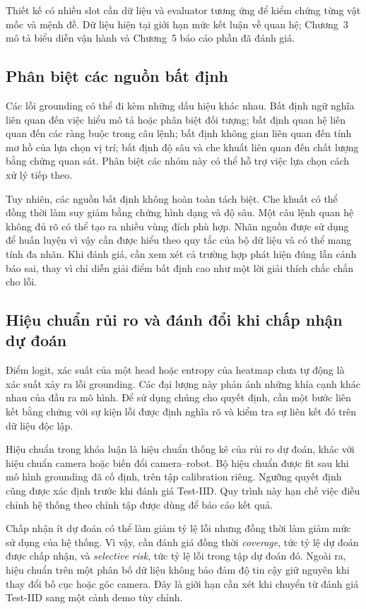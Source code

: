 Thiết kế có nhiều slot cần dữ liệu và evaluator tương ứng để kiểm chứng từng vật mốc và mệnh đề. Dữ liệu hiện tại giới hạn mức kết luận về quan hệ; Chương~3 mô tả biểu diễn vận hành và Chương~5 báo cáo phần đã đánh giá.

\subsection{Phân biệt các nguồn bất định}

Các lỗi grounding có thể đi kèm những dấu hiệu khác nhau. Bất định ngữ nghĩa liên quan đến việc hiểu mô tả hoặc phân biệt đối tượng; bất định quan hệ liên quan đến các ràng buộc trong câu lệnh; bất định không gian liên quan đến tính mơ hồ của lựa chọn vị trí; bất định độ sâu và che khuất liên quan đến chất lượng bằng chứng quan sát. Phân biệt các nhóm này có thể hỗ trợ việc lựa chọn cách xử lý tiếp theo.

Tuy nhiên, các nguồn bất định không hoàn toàn tách biệt. Che khuất có thể đồng thời làm suy giảm bằng chứng hình dạng và độ sâu. Một câu lệnh quan hệ không đủ rõ có thể tạo ra nhiều vùng đích phù hợp. Nhãn nguồn được sử dụng để huấn luyện vì vậy cần được hiểu theo quy tắc của bộ dữ liệu và có thể mang tính đa nhãn. Khi đánh giá, cần xem xét cả trường hợp phát hiện đúng lẫn cảnh báo sai, thay vì chỉ diễn giải điểm bất định cao như một lời giải thích chắc chắn cho lỗi.

\subsection{Hiệu chuẩn rủi ro và đánh đổi khi chấp nhận dự đoán}

Điểm logit, xác suất của một head hoặc entropy của heatmap chưa tự động là xác suất xảy ra lỗi grounding. Các đại lượng này phản ánh những khía cạnh khác nhau của đầu ra mô hình. Để sử dụng chúng cho quyết định, cần một bước liên kết bằng chứng với sự kiện lỗi được định nghĩa rõ và kiểm tra sự liên kết đó trên dữ liệu độc lập.

Hiệu chuẩn trong khóa luận là hiệu chuẩn thống kê của rủi ro dự đoán, khác với hiệu chuẩn camera hoặc biến đổi camera--robot. Bộ hiệu chuẩn được fit sau khi mô hình grounding đã cố định, trên tập calibration riêng. Ngưỡng quyết định cũng được xác định trước khi đánh giá Test-IID. Quy trình này hạn chế việc điều chỉnh hệ thống theo chính tập được dùng để báo cáo kết quả.

Chấp nhận ít dự đoán có thể làm giảm tỷ lệ lỗi nhưng đồng thời làm giảm mức sử dụng của hệ thống. Vì vậy, cần đánh giá đồng thời \textit{coverage}, tức tỷ lệ dự đoán được chấp nhận, và \textit{selective risk}, tức tỷ lệ lỗi trong tập dự đoán đó. Ngoài ra, hiệu chuẩn trên một phân bố dữ liệu không bảo đảm độ tin cậy giữ nguyên khi thay đổi bố cục hoặc góc camera. Đây là giới hạn cần xét khi chuyển từ đánh giá Test-IID sang một cảnh demo tùy chỉnh.

